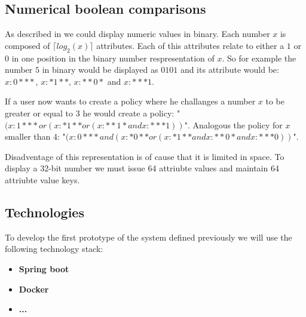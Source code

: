 \subsection{Numerical boolean comparisons}
As described in \cite{bethencourt2007ciphertext} we could display numeric values in binary. Each number $x$ is composed of $\lceil log_2(x) \rceil$ attributes. Each of this attributes relate to either a $1$ or $0$ in one position in the binary number respresentation of $x$. So for example the number $5$ in binary would be displayed as $0101$ and its attribute would be: $x:0***$, $x:*1**$, $x:**0*$ and $x:***1$. 

If a user now wants to create a policy where he challanges a number $x$ to be greater or equal to $3$ he would create a policy: "$(x:1*** or (x:*1** or (x:**1* and x:***1))$". Analogous the policy for $x$ smaller than $4$: "$(x:0*** and (x:*0** or (x:*1** and x:**0* and x:***0))$".

Disadventage of this representation is of cause that it is limited in space. To display a 32-bit number we must issue 64 attriubte values and maintain 64 attriubte value keys. 


\subsection{Technologies}
To develop the first prototype of the system defined previously we will use the following technology stack:

\begin{itemize}
	\item \textbf{Spring boot}
	\item \textbf{Docker}
	\item \textbf{...}
\end{itemize}


 